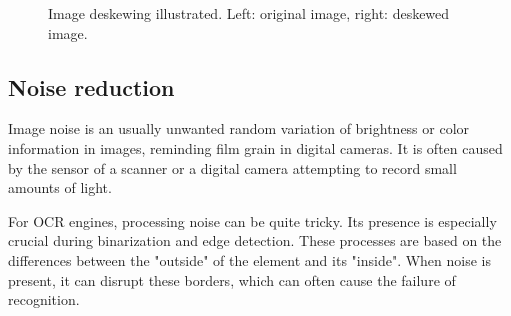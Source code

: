 \begin{figure}
\caption{Image deskewing illustrated. Left: original image, right: deskewed image.}
\label{fig:deskewing}
\end{figure}

\subsection{Noise reduction}

Image noise is an usually unwanted random variation of brightness or color information in images, reminding film grain in digital cameras. It is often caused by the sensor of a scanner or a digital camera attempting to record small amounts of light. 

For OCR engines, processing noise can be quite tricky. Its presence is especially crucial during binarization and edge detection. These processes are based on the differences between the "outside" of the element and its "inside". When noise is present, it can disrupt these borders, which can often cause the failure of recognition.

